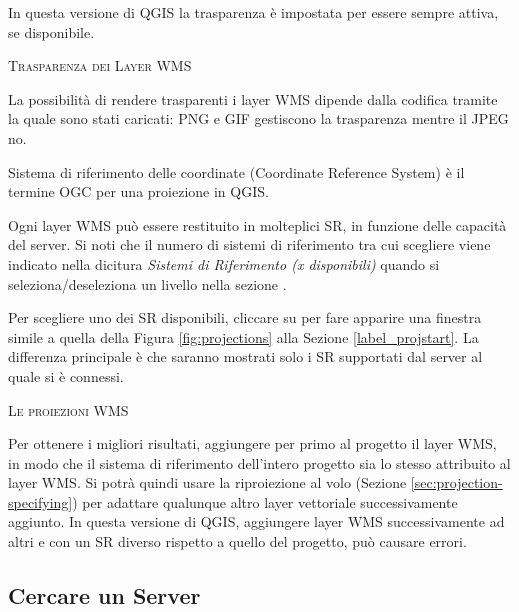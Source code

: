 \label{ogc-wms-transparency}

In questa versione di QGIS la trasparenza è impostata per essere sempre
attiva, se disponibile.

\begin{Tip}[ht]\caption{\textsc{Trasparenza dei Layer WMS}}
La possibilità di rendere trasparenti i layer WMS dipende dalla codifica 
tramite la quale sono stati caricati: PNG e GIF gestiscono la trasparenza mentre il JPEG no.
\end{Tip}


Sistema di riferimento delle coordinate (Coordinate Reference System) è
il termine OGC per una proiezione in QGIS.

Ogni layer WMS può essere restituito in molteplici SR, in funzione delle
capacità del server. Si noti che il numero di sistemi di riferimento tra cui
scegliere viene indicato nella dicitura \textsl{Sistemi di
Riferimento (x disponibili)} quando si seleziona/deseleziona un livello nella
sezione .

Per scegliere uno dei SR disponibili, cliccare su  per fare
apparire una finestra simile a quella della Figura \ref{fig:projections} alla
Sezione \ref{label_projstart}.
La differenza principale è che saranno mostrati solo i SR supportati dal server 
al quale si è connessi.

\begin{Tip}[ht]\caption{\textsc{Le proiezioni WMS}}
Per ottenere i migliori risultati, aggiungere per primo al progetto
il layer WMS, in modo che il sistema di riferimento dell'intero progetto sia
lo stesso attribuito al layer WMS.
Si potrà quindi usare la riproiezione al volo (Sezione \ref{sec:projection-specifying})
per adattare qualunque altro layer vettoriale successivamente aggiunto.
In questa versione di QGIS, aggiungere layer WMS successivamente ad altri e
con un SR diverso rispetto a quello del progetto, può causare errori.
\end{Tip}

\subsection{Cercare un Server}
\label{sec:serversearch}

